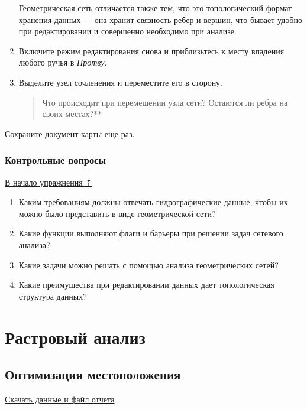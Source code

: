 \documentclass[]{book}
\theoremstyle{definition}
\theoremstyle{definition}
\theoremstyle{definition}
\theoremstyle{remark}
\begin{document}
\begin{enumerate}
  Геометрическая сеть отличается также тем, что это топологический
  формат хранения данных --- она хранит связность ребер и вершин, что
  бывает удобно при редактировании и совершенно необходимо при анализе.
\item
  Включите режим редактирования снова и приблизьтесь к месту впадения
  любого ручья в \emph{Протву}.
\item
  Выделите узел сочленения и переместите его в сторону.

  \begin{quote}
  Что происходит при перемещении узла сети? Остаются ли ребра на своих
  местах?**
  \end{quote}
\end{enumerate}

Сохраните документ карты еще раз.

\hypertarget{network-hydro-questions}{%
\section{Контрольные вопросы}\label{network-hydro-questions}}

\protect\hyperlink{network-hydro}{В начало упражнения ⇡}

\begin{enumerate}
\def\labelenumi{\arabic{enumi}.}
\item
  Каким требованиям должны отвечать гидрографические данные, чтобы их
  можно было представить в виде геометрической сети?
\item
  Какие функции выполняют флаги и барьеры при решении задач сетевого
  анализа?
\item
  Какие задачи можно решать с помощью анализа геометрических сетей?
\item
  Какие преимущества при редактировании данных дает топологическая
  структура данных?
\end{enumerate}

\hypertarget{part--}{%
\part{Растровый анализ}\label{part--}}

\hypertarget{weighted-overlay}{%
\chapter{Оптимизация местоположения}\label{weighted-overlay}}

\href{http://autolab.geogr.msu.ru/gis/data/Ex14.zip}{Скачать данные и
файл отчета}
\end{document}
